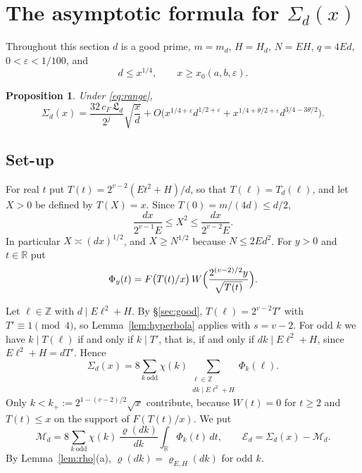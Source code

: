 \documentclass[11pt]{amsart}
\newtheorem{proposition}[theorem]{Proposition}
\theoremstyle{remark}
\theoremstyle{definition}
\numberwithin{equation}{section}
\newcommand{\Z}{\mathbb{Z}}
\newcommand{\R}{\mathbb{R}}
\newcommand{\eps}{\varepsilon}
\newcommand{\Lf}{\mathfrak{L}}
\begin{document}
\section{\texorpdfstring{The asymptotic formula for $\Sigma_d(x)$}{The asymptotic formula for Sigma\_d(x)}}\label{sec:asymp}

Throughout this section $d$ is a good prime, $m=m_d$, $H=H_d$, $N=EH$, $q=4Ed$, $0<\eps<1/100$, and
\begin{equation}\label{eq:range}
d\le x^{1/4},\qquad x\ge x_0(a,b,\eps).
\end{equation}

\begin{proposition}\label{prop:asymp}
Under \eqref{eq:range},
\[
\Sigma_d(x)=\frac{32\,c_F\,\Lf_d}{2^j}\sqrt{\frac xd}+O\bigl(x^{1/4+\eps}d^{1/2+\eps}+x^{1/4+\theta/2+\eps}d^{3/4-3\theta/2}\bigr).
\]
\end{proposition}

\subsection{Set-up}
For real $t$ put $T(t)=2^{v-2}(Et^2+H)/d$, so that $T(\ell)=T_d(\ell)$, and let $X>0$ be defined by $T(X)=x$. Since $T(0)=m/(4d)\le d/2$,
\begin{equation}\label{eq:Xsize}
\frac{dx}{2^{v-1}E}\le X^2\le\frac{dx}{2^{v-2}E}.
\end{equation}
In particular $X\asymp(dx)^{1/2}$, and $X\ge N^{1/2}$ because $N\le2Ed^2$. For $y>0$ and $t\in\R$ put
\[
\Phi_y(t)=F\bigl(T(t)/x\bigr)\,W\Bigl(\frac{2^{(v-2)/2}y}{\sqrt{T(t)}}\Bigr).
\]

Let $\ell\in\Z$ with $d\mid E\ell^2+H$. By \S\ref{sec:good}, $T(\ell)=2^{v-2}T'$ with $T'\equiv1\pmod 4$, so Lemma~\ref{lem:hyperbola} applies with $s=v-2$. For odd $k$ we have $k\mid T(\ell)$ if and only if $k\mid T'$, that is, if and only if $dk\mid E\ell^2+H$, since $E\ell^2+H=dT'$. Hence
\begin{equation}\label{eq:Sigma2}
\Sigma_d(x)=8\sum_{k\ \mathrm{odd}}\chi(k)\sum_{\substack{\ell\in\Z\\ dk\mid E\ell^2+H}}\Phi_k(\ell).
\end{equation}
Only $k<k_+:=2^{1-(v-2)/2}\sqrt x$ contribute, because $W(t)=0$ for $t\ge2$ and $T(t)\le x$ on the support of $F(T(t)/x)$. We put
\begin{equation}\label{eq:ME}
\mathcal M_d=8\sum_{k\ \mathrm{odd}}\chi(k)\,\frac{\varrho(dk)}{dk}\int_\R\Phi_k(t)\,dt,\qquad\mathcal E_d=\Sigma_d(x)-\mathcal M_d .
\end{equation}
By Lemma~\ref{lem:rho}(a), $\varrho(dk)=\varrho_{E,H}(dk)$ for odd $k$.
\end{document}
